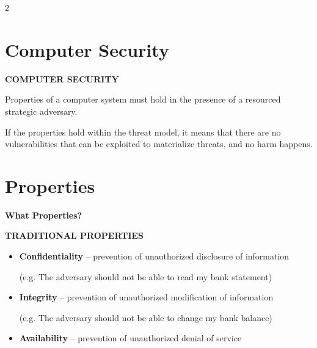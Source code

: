 \documentclass[a4paper,9pt]{extarticle}
\begin{document}

\thispagestyle{fancy}



\begin{multicols}{2}


\section{Computer Security}


\begin{definition}

\textbf{COMPUTER SECURITY}

Properties of a computer system must hold
in the presence of a resourced strategic adversary.

\end{definition}


\begin{important}

If the properties hold within the threat model, it means that there are no vulnerabilities that can be exploited to materialize threats, and no harm happens.

\end{important}



\section{Properties}


\textbf{What Properties?}


\textbf{TRADITIONAL PROPERTIES}

\begin{itemize}

\item \textbf{Confidentiality} -- prevention of unauthorized disclosure of information

(e.g. The adversary should not be able to read my bank statement)

\item \textbf{Integrity} -- prevention of unauthorized modification of information

(e.g. The adversary should not be able to change my bank balance)

\item \textbf{Availability} -- prevention of unauthorized denial of service


\end{itemize}
\end{multicols}
\end{document}
